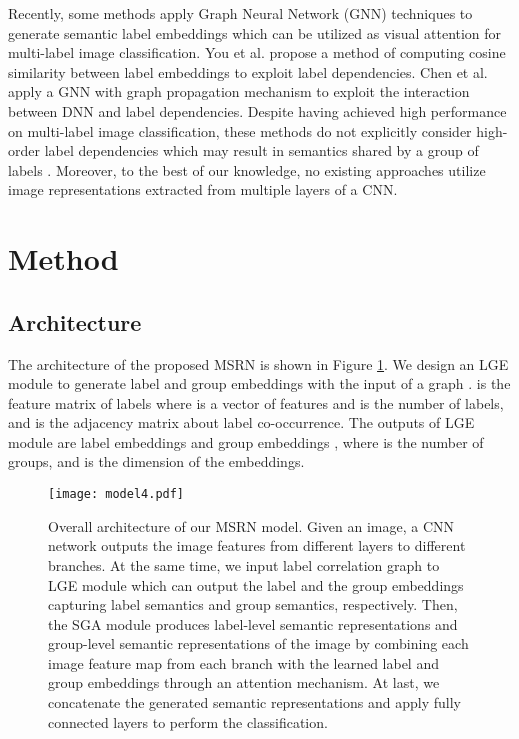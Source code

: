 \documentclass{article} \usepackage{nips14submit_e,times}
\begin{document}
Recently, some methods \cite{AAAI2020:CMA} \cite{CVPR2019:ML-GCN} \cite{ICCV2019:ssgrl} apply Graph
Neural Network (GNN) techniques to generate semantic label embeddings which can be utilized as visual
attention for multi-label image classification.
You et al. \cite{AAAI2020:CMA} propose a method of computing cosine similarity
between label embeddings to exploit label dependencies.
Chen et al. \cite{ICCV2019:ssgrl} apply a GNN with graph propagation mechanism
to exploit the interaction between DNN and label dependencies.
Despite having achieved high performance on multi-label image classification,
these methods do not explicitly consider high-order label dependencies which may result in semantics shared by a group of labels \cite{TKDE14:MLZhang:MLReview}.
Moreover, to the best of our knowledge, no existing approaches utilize image representations extracted from multiple layers of a CNN.

\section{Method}
\label{sec:method}
\subsection{Architecture}
The architecture of the proposed MSRN is shown in Figure \ref{fig:2}.
We design an LGE module to generate label and group embeddings with the input of a graph .  is the feature matrix of labels where  is a vector of features and  is the number of labels,
and  is the adjacency matrix about label co-occurrence.
The outputs of LGE module are label embeddings 
and group embeddings , where  is the number of groups, and  is the dimension of the embeddings.

\begin{figure}[tb]
\centering
\texttt{[image: model4.pdf]}
\caption{Overall architecture of our MSRN model. Given an image, a CNN network outputs the image features from different layers to different branches.
At the same time, we input label correlation graph to LGE module which can output the label and the group embeddings capturing label semantics and group semantics, respectively.
Then, the SGA module produces label-level semantic representations and group-level semantic representations of the image by combining each
image feature map from each branch with the learned label and group embeddings through an attention mechanism.
At last, we concatenate the generated semantic representations and apply fully connected layers to perform the classification.
}
\label{fig:2}
\end{figure}
\end{document}
